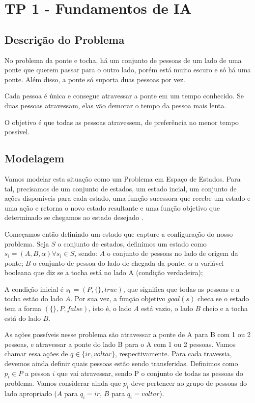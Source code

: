 \documentclass{article}
\begin{document}
\section{TP 1 - Fundamentos de IA}
\subsection{Descrição do Problema}

No problema da ponte e tocha, há um conjunto de pessoas de um lado de uma ponte
que querem passar para o outro lado, porém está muito escuro e só há uma ponte.
Além disso, a ponte só suporta duas pessoas por vez.

Cada pessoa é única e consegue atravessar a ponte em um tempo conhecido.
Se duas pessoas atravessam, elas vão demorar o tempo da pessoa mais lenta.

O objetivo é que todas as pessoas atravessem, de preferência no menor tempo possível.

\subsection{Modelagem}

Vamos modelar esta situação como um Problema em Espaço de Estados.
Para tal, precisamos de um conjunto de estados, um estado incial, um conjunto
de ações disponíveis para cada estado, uma função sucessora que recebe um estado e uma
ação e retorna o novo estado resultante e uma função objetivo que determinado se
chegamos ao estado desejado \parencite{poole2010}.

Começamos então definindo um estado que capture a configuração do nosso problema.
Seja $S$ o conjunto de estados, definimos um estado como $s_i=(A, B, \alpha) \forall s_i \in S$,
sendo:
$A$ o conjunto de pessoas no lado de origem da ponte;
$B$ o conjunto de pessoa do lado de chegada da ponte;
$\alpha$ a variável booleana que diz se a tocha está no lado A (condição verdadeira);

A condição inicial é $s_0=(P, \{\}, true)$, que significa que todas as pessoas e a tocha
estão do lado $A$. Por sua vez, a função objetivo $goal(s)$ checa se o estado tem a forma
$(\{\}, P, false)$, isto é, o lado $A$ está vazio, o lado $B$ cheio e a tocha está do lado $B$.

As ações possíveis nesse problema são atravessar a ponte de A para B com 1 ou 2 pessoas,
e atravessar a ponte do lado B para o A com 1 ou 2 pessoas.
Vamos chamar essa ações de $q \in \{ir, voltar\}$, respectivamente.
Para cada travessia, devemos ainda definir quais pessoas estão sendo transferidas.
Definimos como $p_i \in P$ a pessoa $i$ que vai atravessar, sendo P o conjunto
de todas as pessoas do problema.
Vamos considerar ainda que $p_i$ deve pertencer ao grupo de pessoas do lado apropriado
($A$ para $q_i=ir$, $B$ para $q_i=voltar$).
\end{document}
